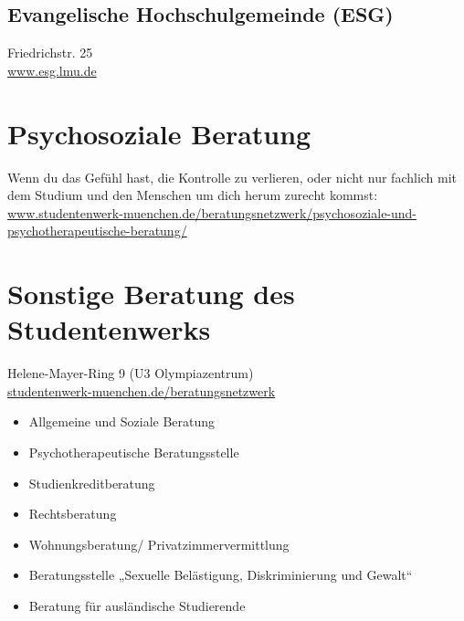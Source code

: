 \subsection*{Evangelische Hochschulgemeinde (ESG)}
Friedrichstr. 25\\
\url{www.esg.lmu.de}



\section{Psychosoziale Beratung}

Wenn du das Gefühl hast, die Kontrolle zu verlieren, oder nicht nur fachlich mit
dem Studium und den Menschen um dich herum zurecht kommst:\\
\url{www.studentenwerk-muenchen.de/beratungsnetzwerk/psychosoziale-und-psychotherapeutische-beratung/}


\section{Sonstige Beratung des Studentenwerks}
Helene-Mayer-Ring 9 (U3 Olympiazentrum)\\
\url{studentenwerk-muenchen.de/beratungsnetzwerk}

\begin{itemize}
	\item Allgemeine und Soziale Beratung
	\item Psychotherapeutische Beratungsstelle
	\item Studienkreditberatung
	\item Rechtsberatung
	\item Wohnungsberatung/ Privatzimmervermittlung
	\item Beratungsstelle „Sexuelle Belästigung, Diskriminierung und Gewalt“
	\item Beratung für ausländische Studierende
\end{itemize}

